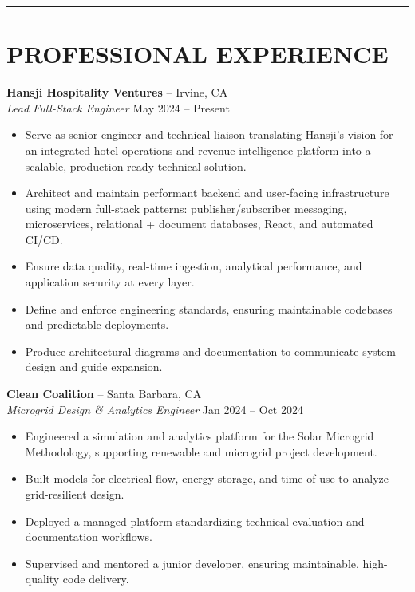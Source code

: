 \documentclass[a4paper,10pt]{article}
\begin{document}
\noindent\rule{\textwidth}{0.4pt}


\section*{PROFESSIONAL EXPERIENCE}
\textbf{Hansji Hospitality Ventures} – Irvine, CA\\
\textit{Lead Full-Stack Engineer} \hfill May 2024 – Present
\begin{itemize}[leftmargin=1em, itemsep=0.5pt]
\item Serve as senior engineer and technical liaison translating Hansji’s vision for an integrated hotel operations and revenue intelligence platform into a scalable, production-ready technical solution.
\item Architect and maintain performant backend and user-facing infrastructure using modern full-stack patterns: publisher/subscriber messaging, microservices, relational + document databases, React, and automated CI/CD.
\item Ensure data quality, real-time ingestion, analytical performance, and application security at every layer.
\item Define and enforce engineering standards, ensuring maintainable codebases and predictable deployments.
\item Produce architectural diagrams and documentation to communicate system design and guide expansion.
\end{itemize}

\textbf{Clean Coalition} – Santa Barbara, CA\\
\textit{Microgrid Design \& Analytics Engineer} \hfill Jan 2024 – Oct 2024
\begin{itemize}[leftmargin=1em, itemsep=0.5pt]
\item Engineered a simulation and analytics platform for the Solar Microgrid Methodology, supporting renewable and microgrid project development.
\item Built models for electrical flow, energy storage, and time-of-use to analyze grid-resilient design.
\item Deployed a managed platform standardizing technical evaluation and documentation workflows.
\item Supervised and mentored a junior developer, ensuring maintainable, high-quality code delivery.
\end{itemize}
\end{document}
